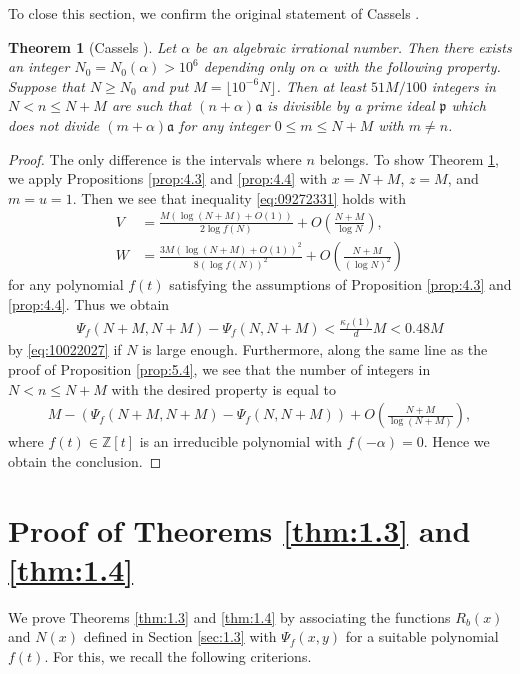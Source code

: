 \documentclass[a4paper,11pt]{amsart}
\newtheorem{theorem}{Theorem}[section]
\theoremstyle{definition}
\numberwithin{equation}{section}
\begin{document}
To close this section, we confirm the original statement of Cassels \cite{Cassels1961}. 

\begin{theorem}[Cassels \cite{Cassels1961}]\label{thm:5.6}
Let $\alpha$ be an algebraic irrational number. 
Then there exists an integer $N_0=N_0(\alpha)>10^6$ depending only on $\alpha$ with the following property. 
Suppose that $N \geq N_0$ and put $M = \lfloor 10^{-6} N \rfloor$. 
Then at least $51M/100$ integers in $N<n \leq N+M$ are such that $(n+\alpha) \mathfrak{a}$ is divisible by a prime ideal $\mathfrak{p}$ which does not divide $(m+\alpha) \mathfrak{a}$ for any integer $0 \leq m \leq N+M$ with $m \neq n$. 
\end{theorem}

\begin{proof}
The only difference is the intervals where $n$ belongs. 
To show Theorem \ref{thm:5.6}, we apply Propositions \ref{prop:4.3} and \ref{prop:4.4} with $x=N+M$, $z=M$, and $m=u=1$. 
Then we see that inequality \eqref{eq:09272331} holds with
\begin{align*}
V
&= \frac{M (\log(N+M)+O(1))}{2 \log{f(N)}}
+ O\left(\frac{N+M}{\log{N}}\right), \\
W
&= \frac{3M (\log(N+M)+O(1))^2}{8(\log{f(N)})^2}
+ O\left(\frac{N+M}{(\log{N})^2}\right) 
\end{align*}
for any polynomial $f(t)$ satisfying the assumptions of Proposition \ref{prop:4.3} and \ref{prop:4.4}. 
Thus we obtain
\begin{align*}
\Psi_f(N+M,N+M)-\Psi_f(N,N+M)
< \frac{\kappa_f(1)}{d}M 
< 0.48M
\end{align*}
by \eqref{eq:10022027} if $N$ is large enough. 
Furthermore, along the same line as the proof of Proposition \ref{prop:5.4}, we see that the number of integers in $N<n \leq N+M$ with the desired property is equal to
\begin{align*}
M - \left(\Psi_f(N+M,N+M)-\Psi_f(N,N+M)\right)
+ O\left(\frac{N+M}{\log(N+M)}\right), 
\end{align*}
where $f(t) \in \mathbb{Z}[t]$ is an irreducible polynomial with $f(-\alpha)=0$. 
Hence we obtain the conclusion. 
\end{proof}


\section{Proof of Theorems \ref{thm:1.3} and \ref{thm:1.4}}\label{sec:6}
We prove Theorems \ref{thm:1.3} and \ref{thm:1.4} by associating the functions $R_b(x)$ and $N(x)$ defined in Section \ref{sec:1.3} with $\Psi_f(x,y)$ for a suitable polynomial $f(t)$. 
For this, we recall the following criterions. 
\end{document}
